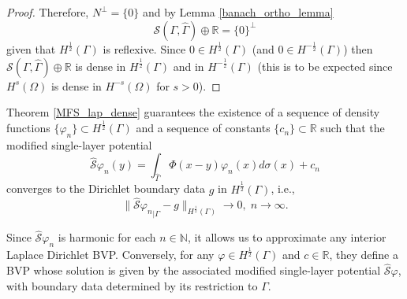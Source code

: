 \begin{proof}
    Therefore, \(N^\perp = \{0\}\) and by Lemma \ref{banach_ortho_lemma}
    \[
        \mathcal{S}(\Gamma, \hat{\Gamma}) \oplus \mathbb{R} = \{0\}^\perp
    \]
    given that \(H^\frac{1}{2}(\Gamma)\) is reflexive. Since \(0 \in H^\frac{1}{2}(\Gamma)\) (and \(0 \in H^{-\frac{1}{2}}(\Gamma)\)) then \(\mathcal{S}(\Gamma, \hat{\Gamma}) \oplus \mathbb{R}\) is dense in \(H^\frac{1}{2}(\Gamma)\) and in \(H^{-\frac{1}{2}}(\Gamma)\) (this is to be expected since \(H^{s}(\Omega)\) is dense in \(H^{-s}(\Omega)\) for \(s > 0\)).
\end{proof}

\begin{remark}\label{remark_density_sequence_density_layers}
    Theorem \ref{MFS_lap_dense} guarantees the existence of a sequence of density functions $\{\varphi_n\} \subset H^{\frac{1}{2}}(\Gamma)$ and a sequence of constants $\{c_n\} \subset \mathbb{R}$ such that the modified single-layer potential
    \[
    \hat{\mathcal{S}}\varphi_n(y) = \int_{\hat{\Gamma}} \Phi(x-y)\varphi_n(x) d\sigma(x) + c_n
    \]
    converges to the Dirichlet boundary data $g$ in $H^\frac{1}{2}(\Gamma)$, i.e.,
    \[
    \|{\hat{\mathcal{S}}\varphi_n}_{|\Gamma} - g\|_{H^\frac{1}{2}(\Gamma)} \rightarrow 0, \; n \rightarrow \infty.
    \]
    
    Since $\hat{\mathcal{S}}\varphi_n$ is harmonic for each $n \in \mathbb{N}$, it allows us to approximate any interior Laplace Dirichlet \ac{BVP}. Conversely, for any $\varphi \in H^\frac{1}{2}(\Gamma)$ and $c \in \mathbb{R}$, they define a \ac{BVP} whose solution is given by the associated modified single-layer potential $\hat{\mathcal{S}}\varphi$, with boundary data determined by its restriction to \(\Gamma\).
    
\end{remark}

